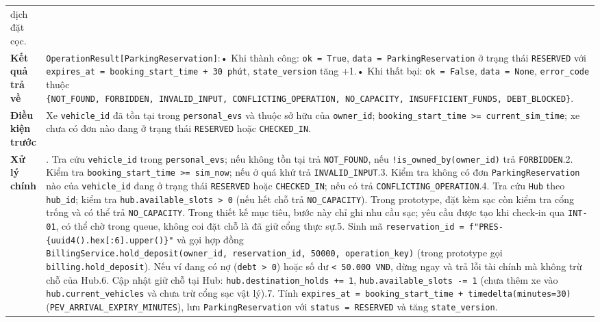 \documentclass[11pt,a4paper]{article}
\begin{document}
\begin{longtable}[]{@{}
  >{\raggedright\arraybackslash}p{}
  >{\raggedright\arraybackslash}p{}@{}}
dịch đặt cọc. \\
\textbf{Kết quả trả về} &
\texttt{OperationResult{[}ParkingReservation{]}}:• Khi thành công:
\texttt{ok\ =\ True}, \texttt{data\ =\ ParkingReservation} ở trạng thái
\texttt{RESERVED} với
\texttt{expires\_at\ =\ booking\_start\_time\ +\ 30\ phút},
\texttt{state\_version} tăng +1.• Khi thất bại: \texttt{ok\ =\ False},
\texttt{data\ =\ None}, \texttt{error\_code} thuộc
\texttt{\{NOT\_FOUND,\ FORBIDDEN,\ INVALID\_INPUT,\ CONFLICTING\_OPERATION,\ NO\_CAPACITY,\ INSUFFICIENT\_FUNDS,\ DEBT\_BLOCKED\}}. \\
\textbf{Điều kiện trước} & Xe \texttt{vehicle\_id} đã tồn tại trong
\texttt{personal\_evs} và thuộc sở hữu của \texttt{owner\_id};
\texttt{booking\_start\_time\ \textgreater{}=\ current\_sim\_time}; xe
chưa có đơn nào đang ở trạng thái \texttt{RESERVED} hoặc
\texttt{CHECKED\_IN}. \\
\textbf{Xử lý chính} & 1. Tra cứu \texttt{vehicle\_id} trong
\texttt{personal\_evs}; nếu không tồn tại trả \texttt{NOT\_FOUND}, nếu
\texttt{!is\_owned\_by(owner\_id)} trả \texttt{FORBIDDEN}.2. Kiểm tra
\texttt{booking\_start\_time\ \textgreater{}=\ sim\_now}; nếu ở quá khứ
trả \texttt{INVALID\_INPUT}.3. Kiểm tra không có đơn
\texttt{ParkingReservation} nào của \texttt{vehicle\_id} đang ở trạng
thái \texttt{RESERVED} hoặc \texttt{CHECKED\_IN}; nếu có trả
\texttt{CONFLICTING\_OPERATION}.4. Tra cứu \texttt{Hub} theo
\texttt{hub\_id}; kiểm tra
\texttt{hub.available\_slots\ \textgreater{}\ 0} (nếu hết chỗ trả
\texttt{NO\_CAPACITY}). Trong prototype, đặt kèm sạc còn kiểm tra cổng
trống và có thể trả \texttt{NO\_CAPACITY}. Trong thiết kế mục tiêu, bước
này chỉ ghi nhu cầu sạc; yêu cầu được tạo khi check-in qua
\texttt{INT-01}, có thể chờ trong queue, không coi đặt chỗ là đã giữ
cổng thực sự.5. Sinh mã
\texttt{reservation\_id\ =\ f"PRES-\{uuid4().hex{[}:6{]}.upper()\}"} và
gọi hợp đồng
\texttt{BillingService.hold\_deposit(owner\_id,\ reservation\_id,\ 50000,\ operation\_key)}
(trong prototype gọi \texttt{billing.hold\_deposit}). Nếu ví đang có nợ
(\texttt{debt\ \textgreater{}\ 0}) hoặc số dư
\texttt{\textless{}\ 50.000\ VNĐ}, dừng ngay và trả lỗi tài chính mà
không trừ chỗ của Hub.6. Cập nhật giữ chỗ tại Hub:
\texttt{hub.destination\_holds\ +=\ 1},
\texttt{hub.available\_slots\ -=\ 1} (chưa thêm xe vào
\texttt{hub.current\_vehicles} và chưa trừ cổng sạc vật lý).7. Tính
\texttt{expires\_at\ =\ booking\_start\_time\ +\ timedelta(minutes=30)}
(\texttt{PEV\_ARRIVAL\_EXPIRY\_MINUTES}), lưu
\texttt{ParkingReservation} với \texttt{status\ =\ RESERVED} và tăng
\texttt{state\_version}. \\

\end{longtable}
\end{document}
